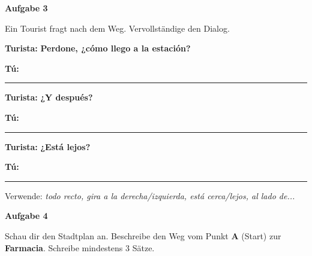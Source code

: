 \documentclass[11pt, a4paper]{article}
\newcommand{\fachfarbe}{spanisch}
\newcommand{\punktebox}[1]{\hfill\fbox{\small \_/#1}}
\newcommand{\luecke}[1]{\rule{#1}{0.4pt}}
\newenvironment{aufgabe}[1]{%
    \needspace{5\baselineskip}%
    \nopagebreak[4]%
    \vspace{10pt}
    \noindent\textbf{\textcolor{\fachfarbe}{Aufgabe #1}}
    \nopagebreak[4]%
    \vspace{5pt}
    \nopagebreak[4]%
    \begin{list}{}{\leftmargin=0pt}
    \item[]
}{%
    \end{list}
}
\newcommand{\es}[1]{\textcolor{\fachfarbe}{\textbf{#1}}}
\begin{document}
\begin{aufgabe}{3}
Ein Tourist fragt nach dem Weg. Vervollständige den Dialog. \punktebox{6}
\end{aufgabe}

\noindent
\textbf{Turista:} \es{Perdone, ¿cómo llego a la estación?}

\vspace{0.3em}

\textbf{Tú:} \luecke{11cm}

\vspace{0.8em}

\textbf{Turista:} \es{¿Y después?}

\vspace{0.3em}

\textbf{Tú:} \luecke{11cm}

\vspace{0.8em}

\textbf{Turista:} \es{¿Está lejos?}

\vspace{0.3em}

\textbf{Tú:} \luecke{11cm}

\vspace{0.8em}

\begin{hinweis}
Verwende: \textit{todo recto, gira a la derecha/izquierda, está cerca/lejos, al lado de...}
\end{hinweis}

\vspace{15pt}


\begin{aufgabe}{4}
Schau dir den Stadtplan an. Beschreibe den Weg vom Punkt \textbf{A} (Start) zur \textbf{Farmacia}. Schreibe mindestens 3 Sätze. \punktebox{6}
\end{aufgabe}
\end{document}
